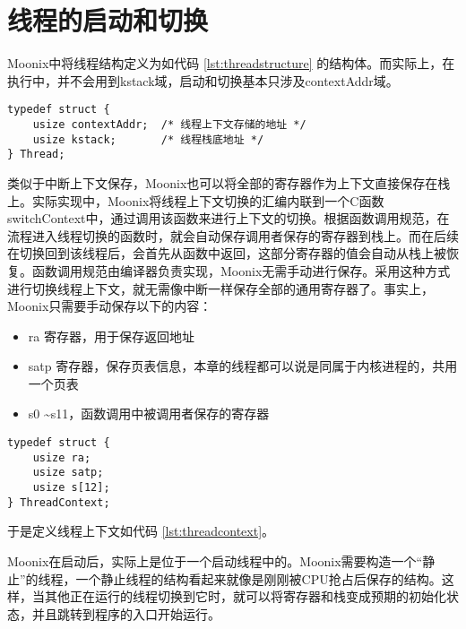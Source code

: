 \section{线程的启动和切换}

Moonix中将线程结构定义为如代码 \ref{lst:threadstructure} 的结构体。而实际上，在执行中，并不会用到kstack域，启动和切换基本只涉及contextAddr域。

\begin{minipage}[c]{0.95\textwidth}
\begin{lstlisting}[language={moonix}, caption={线程结构定义}, label={lst:threadstructure}]
typedef struct {
	usize contextAddr;  /* 线程上下文存储的地址 */
	usize kstack;       /* 线程栈底地址 */
} Thread;
\end{lstlisting}
\end{minipage}

类似于中断上下文保存，Moonix也可以将全部的寄存器作为上下文直接保存在栈上。实际实现中，Moonix将线程上下文切换的汇编内联到一个C函数switchContext中，通过调用该函数来进行上下文的切换。根据函数调用规范，在流程进入线程切换的函数时，就会自动保存调用者保存的寄存器到栈上。而在后续在切换回到该线程后，会首先从函数中返回，这部分寄存器的值会自动从栈上被恢复。函数调用规范由编译器负责实现，Moonix无需手动进行保存。采用这种方式进行切换线程上下文，就无需像中断一样保存全部的通用寄存器了。事实上，Moonix只需要手动保存以下的内容：

\begin{itemize}
	\item ra 寄存器，用于保存返回地址
	\item satp 寄存器，保存页表信息，本章的线程都可以说是同属于内核进程的，共用一个页表
	\item s0 \textasciitilde s11，函数调用中被调用者保存的寄存器
\end{itemize}

\begin{minipage}[c]{0.95\textwidth}
\begin{lstlisting}[language={moonix}, caption={线程上下文定义}, label={lst:threadcontext}]
typedef struct {
	usize ra;
	usize satp;
	usize s[12];
} ThreadContext;
\end{lstlisting}
\end{minipage}

于是定义线程上下文如代码 \ref{lst:threadcontext}。

Moonix在启动后，实际上是位于一个启动线程中的。Moonix需要构造一个“静止”的线程，一个静止线程的结构看起来就像是刚刚被CPU抢占后保存的结构。这样，当其他正在运行的线程切换到它时，就可以将寄存器和栈变成预期的初始化状态，并且跳转到程序的入口开始运行。

